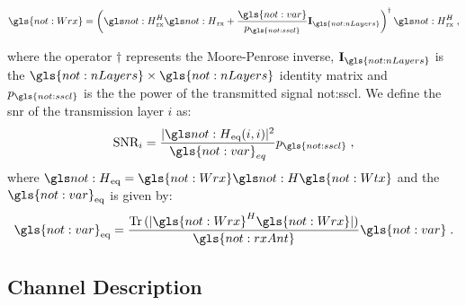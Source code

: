 \begin{equation}
\label{eq.:Wrx}
\gls{not:Wrx} =
\left(
\channel_{\textrm{rx}}^H
\channel_{\textrm{rx}}
+
\frac{ \gls{not:var} }{ p_{\gls{not:sscl}} }
\mathbf{I}_{\gls{not:nLayers}} \right)^\dagger
\channel_{\textrm{rx}}^H \;,
\end{equation}

\noindent where the operator $\dagger$ represents the Moore-Penrose inverse, $\mathbf{ I}_{\gls{not:nLayers}} $ is the $\gls{not:nLayers} \times \gls{not:nLayers}$ identity matrix and $p_{\gls{not:sscl}}$ is the the power of the transmitted signal \gls{not:sscl}.
%
We define the \gls{snr} of the transmission layer $i$ as:
%
\begin{equation}
\label{eq.:snr}
\textrm{SNR}_i = \frac{ \abs{
		\channel_{\textrm{eq}} (i,i)
	}^2 }{\gls{not:var}_{eq}} p_{\gls{not:sscl}} \; ,
\end{equation}
%
where $\channel_{\textrm{eq}} = \gls{not:Wrx} \channel \gls{not:Wtx}$ and the $\gls{not:var}_{\textrm{eq}}$ is given by:
%
\begin{equation}
\gls{not:var}_{\textrm{eq}} = \frac{
	\Tr \,  (\abs{ \gls{not:Wrx}^H \gls{not:Wrx} } )}
{\gls{not:rxAnt}}
\gls{not:var} \;.
\end{equation}

\subsection{Channel Description}



